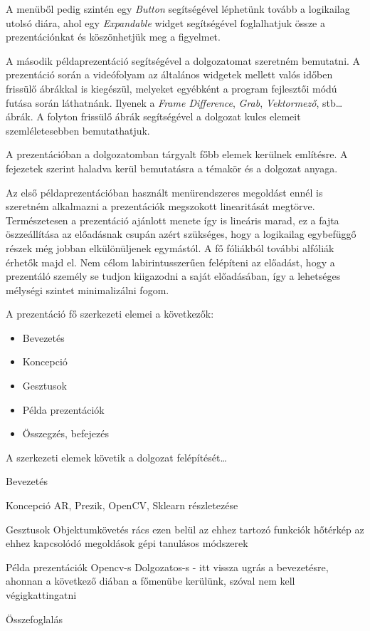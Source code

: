 A menüből pedig szintén egy \textit{Button} segítségével léphetünk tovább a logikailag utolsó diára, ahol egy \textit{Expandable} widget segítségével foglalhatjuk össze a prezentációnkat és köszönhetjük meg a figyelmet.


A második példaprezentáció segítségével a dolgozatomat szeretném bemutatni.
A prezentáció során a videófolyam az általános widgetek mellett valós időben frissülő ábrákkal is kiegészül, melyeket egyébként a program fejlesztői módú futása során láthatnánk. Ilyenek a \textit{Frame Difference}, \textit{Grab}, \textit{Vektormező}, stb\ldots ábrák. A folyton frissülő ábrák segítségével a dolgozat kulcs elemeit szemléletesebben bemutathatjuk.

A prezentációban a dolgozatomban tárgyalt főbb elemek kerülnek említésre. A fejezetek szerint haladva kerül bemutatásra a témakör és a dolgozat anyaga.

Az első példaprezentációban használt menürendszeres megoldást ennél is szeretném alkalmazni a prezentációk megszokott linearitását megtörve. Természetesen a prezentáció ajánlott menete így is lineáris marad, ez a fajta öszzeállítása az előadásnak csupán azért szükséges, hogy a logikailag egybefüggő részek még jobban elkülönüljenek egymástól. A fő fóliákból további alfóliák érhetők majd el. Nem célom labirintusszerűen felépíteni az előadást, hogy a prezentáló személy se tudjon kiigazodni a saját előadásában, így a lehetséges mélységi szintet minimalizálni fogom.

A prezentáció fő szerkezeti elemei a következők:
\begin{itemize}
	\item Bevezetés
	\item Koncepció
	\item Gesztusok
	\item Példa prezentációk
	\item Összegzés, befejezés
\end{itemize}
A szerkezeti elemek követik a dolgozat felépítését\ldots

Bevezetés

Koncepció
	AR, Prezik, OpenCV, Sklearn részletezése

Gesztusok
	Objektumkövetés
	rács
		ezen belül az ehhez tartozó funkciók
	hőtérkép
		az ehhez kapcsolódó megoldások
	gépi tanulásos módszerek
	
Példa prezentációk
	Opencv-s
	Dolgozatos-s - itt vissza ugrás a bevezetésre, ahonnan a következő diában a főmenübe kerülünk, szóval nem kell végigkattingatni

Összefoglalás
